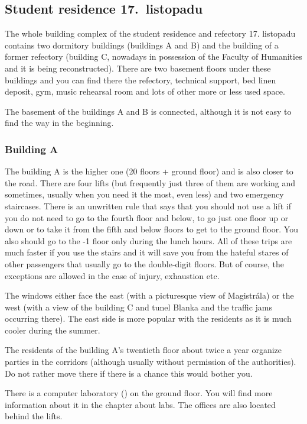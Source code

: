 \subsection{Student residence 17.~listopadu}

The whole building complex of the student residence and refectory 17. listopadu
contains two dormitory buildings (buildings A and B) and the building of a
former refectory (building C, nowadays in possession of the Faculty of
Humanities and it is being reconstructed).
There are two basement floors under these buildings and you can find there the
refectory, technical support, bed linen deposit, gym, music rehearsal room and
lots of other more or less used space.

The basement of the buildings A and B is connected, although it is not easy to
find the way in the beginning.

\subsubsection{Building A}
The building A is the higher one (20 floors + ground floor) and is also closer
to the road. There are four lifts (but frequently just three of them are working
and sometimes, usually when you need it the most, even less) and two emergency
staircases.
There is an unwritten rule that says that you should not use a lift if you do
not need to go to the fourth floor and below, to go just one floor up
or down or to take it from the fifth and below floors to get to the
ground floor. You also should go to the -1 floor only during the lunch hours.
All of these trips are much faster if you use the stairs and it will save you
from the hateful stares of other passengers that usually go to the double-digit
floors.
But of course, the exceptions are allowed in the case of injury, exhaustion etc.

The windows either face the east (with a picturesque view of Magistrála) or the
west (with a view of the building C and tunel Blanka and the traffic jams
occurring there).
The east side is more popular with the residents as it is much cooler during the
summer.

The residents of the building A's twentieth floor about twice a year organize
parties in the corridors (although usually without permission of the
authorities). Do not rather move there if there is a chance this would bother
you.

There is a computer laboratory () on the ground floor. You will find
more information about it in the chapter about labs.
The offices are also located behind the lifts.


